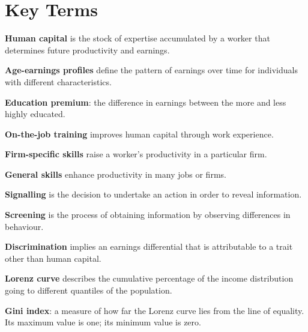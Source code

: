 \newpage
	\section*{Key Terms}
\begin{keyterms}
\textbf{Human capital} is the stock of expertise accumulated by a worker that determines future productivity and earnings.

\textbf{Age-earnings profiles} define the pattern of earnings over time for individuals with different characteristics.

\textbf{Education premium}: the difference in earnings between the more and less highly educated.

\textbf{On-the-job training} improves human capital through work experience.

\textbf{Firm-specific skills} raise a worker's productivity in a particular firm.

\textbf{General skills} enhance productivity in many jobs or firms.

\textbf{Signalling} is the decision to undertake an action in order to reveal information.

\textbf{Screening} is the process of obtaining information by observing differences in behaviour.

\textbf{Discrimination} implies an earnings differential that is attributable to a trait other than human capital.

\textbf{Lorenz curve} describes the cumulative percentage of the income distribution going to different quantiles of the population.

\textbf{Gini index}: a measure of how far the Lorenz curve lies from the line of equality. Its maximum value is one; its minimum value is zero.
\end{keyterms}